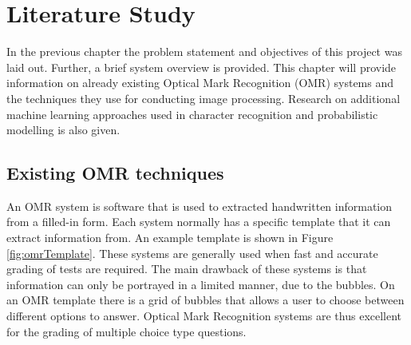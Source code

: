 \chapter{Literature Study}
\label{ch:LiteratureStudy}
\graphicspath{{Chapter2/Chapter2Figures/}}

In the previous chapter the problem statement and objectives of this project was laid out. Further, a brief system overview is provided.
This chapter will provide information on already existing Optical Mark Recognition (OMR) systems and the techniques they use for conducting image processing. Research on additional machine learning approaches used in character recognition and probabilistic modelling is also given.

\section{Existing OMR techniques}
An OMR system is software that is used to extracted handwritten information from a filled-in form. Each system normally has a specific template that it can extract information from. An example template is shown in Figure \ref{fig:omrTemplate}. These systems are generally used when fast and accurate grading of tests are required. The main drawback of these systems is that information can only be portrayed in a limited manner, due to the bubbles. On an OMR template there is a grid of bubbles that allows a user to choose between different options to answer. Optical Mark Recognition systems are thus excellent for the grading of multiple choice type questions. 

